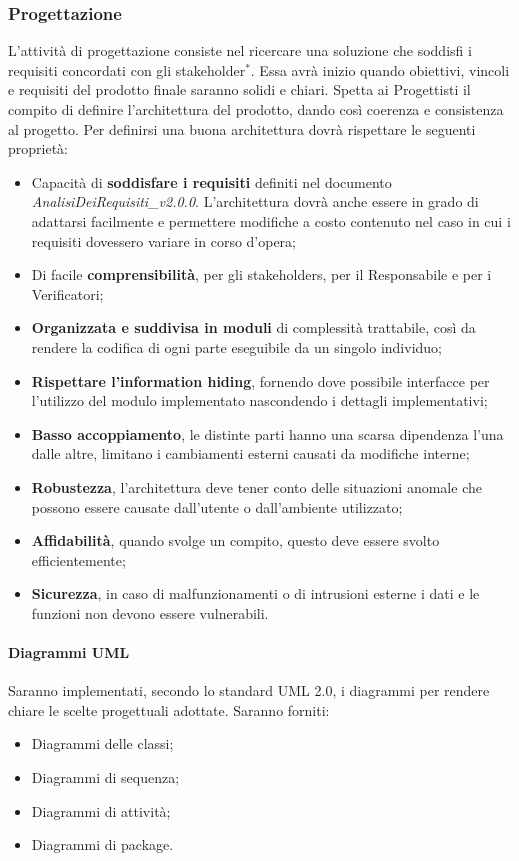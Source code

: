 \documentclass[11pt,a4paper]{article}
\begin{document}
{	\subsubsection{Progettazione}
	L'attività di progettazione consiste nel ricercare una soluzione che soddisfi i requisiti concordati con gli stakeholder$^*$. Essa avrà inizio quando obiettivi, vincoli e requisiti del prodotto finale saranno solidi e chiari. Spetta ai Progettisti il compito di definire l'architettura del prodotto, dando così coerenza e consistenza al progetto. Per definirsi una buona architettura dovrà rispettare le seguenti proprietà:
	\begin{itemize}
		\item Capacità di \textbf{soddisfare i requisiti} definiti nel documento \textit{AnalisiDeiRequisiti\_v2.0.0}. L'architettura dovrà anche essere in grado di adattarsi facilmente e permettere modifiche a costo contenuto nel caso in cui i requisiti dovessero variare in corso d'opera;
		\item Di facile \textbf{comprensibilità}, per gli stakeholders, per il Responsabile e per i Verificatori;
		\item \textbf{Organizzata e suddivisa in moduli} di complessità trattabile, così da rendere la codifica di ogni parte eseguibile da un singolo individuo;
		\item \textbf{Rispettare l'information hiding}, fornendo dove possibile interfacce per l'utilizzo del modulo implementato nascondendo i dettagli implementativi;
		\item \textbf{Basso accoppiamento}, le distinte parti hanno una scarsa dipendenza l'una dalle altre, limitano i cambiamenti esterni causati da modifiche interne;
		\item \textbf{Robustezza}, l'architettura deve tener conto delle situazioni anomale che possono essere causate dall'utente o dall'ambiente utilizzato;
		\item \textbf{Affidabilità}, quando svolge un compito, questo deve essere svolto efficientemente;
		\item \textbf{Sicurezza}, in caso di malfunzionamenti o di intrusioni esterne i dati e le funzioni non devono essere vulnerabili.
	\end{itemize}	
	\paragraph{Diagrammi UML\\} 
	Saranno implementati, secondo lo standard UML 2.0, i diagrammi per rendere chiare le scelte progettuali adottate. Saranno forniti:
	\begin{itemize}
		\item Diagrammi delle classi;
		\item Diagrammi di sequenza;
		\item Diagrammi di attività;
		\item Diagrammi di package.
	\end{itemize}
}
\end{document}
